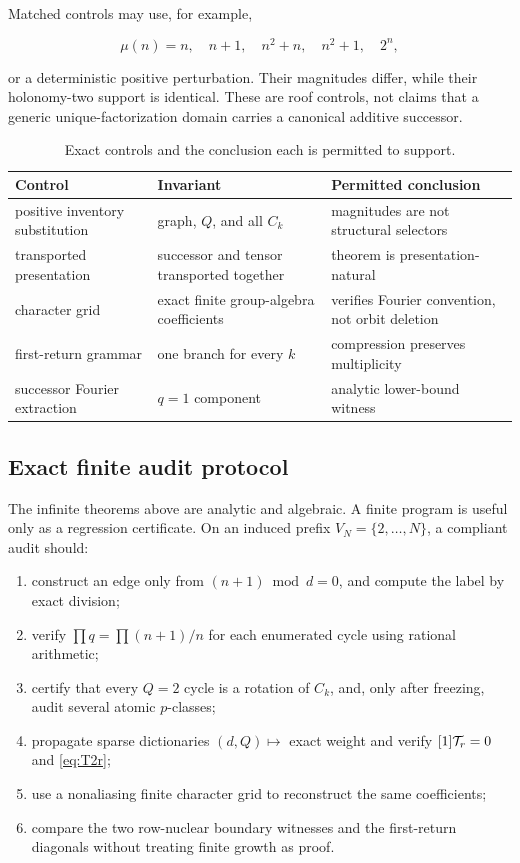 Matched controls may use, for example,

\[
 \mu(n)=n,\quad n+1,\quad n^2+n,\quad n^2+1,\quad 2^n,
\]

or a deterministic positive perturbation.  Their magnitudes differ, while
their holonomy-two support is identical.  These are roof controls, not claims
that a generic unique-factorization domain carries a canonical additive
successor.

\begin{table}[t]
\centering
\small
\caption{Exact controls and the conclusion each is permitted to support.}
\label{tab:controls}
\begin{tabularx}{\textwidth}{L{0.28\textwidth}L{0.31\textwidth}Y}
\toprule
Control & Invariant & Permitted conclusion \\
\midrule
positive inventory substitution
& graph, \(Q\), and all \(C_k\)
& magnitudes are not structural selectors \\
transported presentation
& successor and tensor transported together
& theorem is presentation-natural \\
character grid
& exact finite group-algebra coefficients
& verifies Fourier convention, not orbit deletion \\
first-return grammar
& one branch for every \(k\)
& compression preserves multiplicity \\
successor Fourier extraction
& \(q=1\) component
& analytic lower-bound witness \\
\bottomrule
\end{tabularx}
\end{table}

\subsection{Exact finite audit protocol}

The infinite theorems above are analytic and algebraic.  A finite program is
useful only as a regression certificate.  On an induced prefix
\(V_N=\{2,\ldots,N\}\), a compliant audit should:

\begin{enumerate}
\item construct an edge only from \((n+1)\bmod d=0\), and compute the label by
exact division;
\item verify \(\prod q=\prod(n+1)/n\) for each enumerated cycle using rational
arithmetic;
\item certify that every \(Q=2\) cycle is a rotation of \(C_k\), and, only
after freezing, audit several atomic \(p\)-classes;
\item propagate sparse dictionaries \((d,Q)\mapsto\) exact weight and verify
\([1]\mathcal T_r=0\) and \cref{eq:T2r};
\item use a nonaliasing finite character grid to reconstruct the same
coefficients;
\item compare the two row-nuclear boundary witnesses and the first-return
diagonals without treating finite growth as proof.
\end{enumerate}

